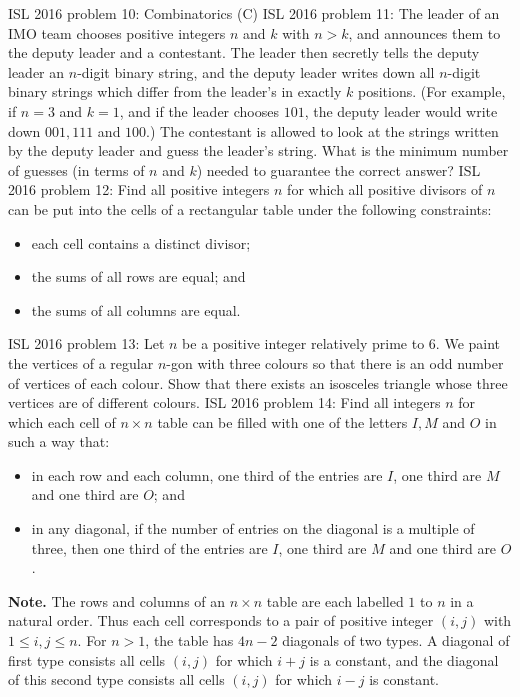 ISL 2016 problem 10:  Combinatorics (C) 
ISL 2016 problem 11:  The leader of an IMO team chooses positive integers $n$ and $k$ with $n > k$, and announces them to the deputy leader and a contestant. The leader then secretly tells the deputy leader an $n$-digit binary string, and the deputy leader writes down all $n$-digit binary strings which differ from the leader’s in exactly $k$ positions. (For example, if $n = 3$ and $k = 1$, and if the leader chooses $101$, the deputy leader would write down $001, 111$ and $100$.) The contestant is allowed to look at the strings written by the deputy leader and guess the leader’s string. What is the minimum number of guesses (in terms of $n$ and $k$) needed to guarantee the correct answer? 
ISL 2016 problem 12:  Find all positive integers $n$ for which all positive divisors of $n$ can be put into the cells of a rectangular table under the following constraints:
\begin{itemize}
  \item each cell contains a distinct divisor;
  \item the sums of all rows are equal; and
  \item the sums of all columns are equal.
\end{itemize} 
ISL 2016 problem 13:  Let $n$ be a positive integer relatively prime to $6$. We paint the vertices of a regular $n$-gon with three colours so that there is an odd number of vertices of each colour. Show that there exists an isosceles triangle whose three vertices are of different colours. 
ISL 2016 problem 14:  Find all integers $n$ for which each cell of $n \times n$ table can be filled with one of the letters $I,M$ and $O$ in such a way that:
\begin{itemize}
  \item in each row and each column, one third of the entries are $I$, one third are $M$ and one third are $O$; and 
  \item in any diagonal, if the number of entries on the diagonal is a multiple of three, then one third of the entries are $I$, one third are $M$ and one third are $O$.
\end{itemize}
\textbf{Note.} The rows and columns of an $n \times n$ table are each labelled $1$ to $n$ in a natural order. Thus each cell corresponds to a pair of positive integer $(i,j)$ with $1 \le i,j \le n$. For $n>1$, the table has $4n-2$ diagonals of two types. A diagonal of first type consists all cells $(i,j)$  for which $i+j$ is a constant, and the diagonal of this second type consists all cells $(i,j)$ for which $i-j$ is constant. 
